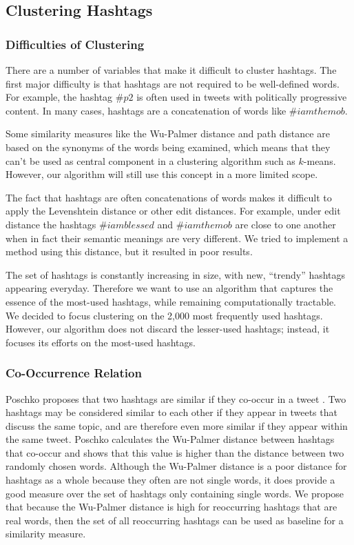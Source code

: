 \subsection{Clustering Hashtags}
\subsubsection{Difficulties of Clustering}
There are a number of variables that make it difficult to cluster hashtags. The first major difficulty is that hashtags are not required to be well-defined words. For example, the hashtag $\#p2$ is often used in tweets with politically progressive content. In many cases, hashtags are a concatenation of words like $\#iamthemob$.  

Some similarity measures like the Wu-Palmer distance and path distance are based on the synonyms of the words being examined, which means that they can't be used as central component in a clustering algorithm such as $k$-means. However, our algorithm will still use this concept in a more limited scope.

The fact that hashtags are often concatenations of words makes it difficult to apply the Levenshtein distance or other edit distances. For example, under edit distance the hashtags $\#iamblessed$ and $\#iamthemob$ are close to one another when in fact their semantic meanings are very different. We tried to implement a method using this distance, but it resulted in poor results.

The set of hashtags is constantly increasing in size, with new, ``trendy'' hashtags appearing everyday. Therefore we want to use an algorithm that captures the essence of the most-used hashtags, while remaining computationally tractable. We decided to focus clustering on the 2,000 most frequently used hashtags. However, our algorithm does not discard the lesser-used hashtags; instead, it focuses its efforts on the most-used hashtags.

\subsubsection{Co-Occurrence Relation}
Poschko proposes that two hashtags are similar if they co-occur in a tweet \cite{Poschko2011}. Two hashtags may be considered similar to each other if they appear in tweets that discuss the same topic, and are therefore even more similar if they appear within the same tweet. Poschko calculates the Wu-Palmer distance between hashtags that co-occur and shows that this value is higher than the distance between two randomly chosen words. Although the Wu-Palmer distance is a poor distance for hashtags as a whole because they often are not single words, it does provide a good measure over the set of hashtags only containing single words. We propose that because the Wu-Palmer distance is high for reoccurring hashtags that are real words, then the set of all reoccurring hashtags can be used as baseline for a similarity measure.

